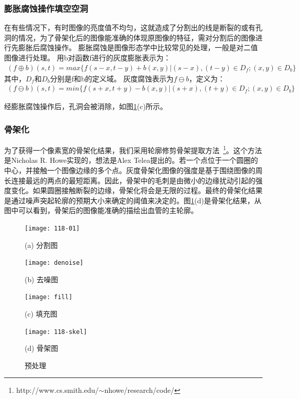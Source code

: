 \subsubsection{膨胀腐蚀操作填空空洞}
在有些情况下，有时图像的亮度值不均匀，这就造成了分割出的线是断裂的或有孔洞的情况，为了骨架化后的图像能准确的体现原图像的特征，需对分割后的图像进行先膨胀后腐蚀操作。
膨胀腐蚀是图像形态学中比较常见的处理，一般是对二值图像进行处理。
用b对函数f进行的灰度膨胀\cite{gang}表示为：
\begin{align}
(f\oplus b)(s,t)=max\{f(s-x, t-y)+b(x,y)|(s-x),(t-y)\in D_f;(x,y)\in D_b\}
\end{align}
其中，$D_f$和$D_b$分别是f和b的定义域。
灰度腐蚀表示为$f \ominus b$，定义为：
\begin{align}
(f \ominus b)(s,t)=min\{f(s+x, t+y)-b(x,y)|(s+x),(t+y)\in D_f;(x,y)\in D_b\}
\end{align}

经膨胀腐蚀操作后，孔洞会被消除，如图\ref{fig:Preprocessing}(c)所示。

\subsubsection{骨架化}
为了获得一个像素宽的骨架化结果，我们采用轮廓修剪骨架提取方法~\footnote{http://www.cs.smith.edu/$\sim$nhowe/research/code/}。这个方法是Nicholas R. Howe实现的，想法是Alex Telea提出的。若一个点位于一个圆圈的中心，并接触一个图像边缘的多个点。灰度骨架化图像的强度是基于围绕图像的周长连接最远的两点的最短距离。因此，骨架中的毛刺是由微小的边缘扰动引起的强度变化。如果圆圈接触断裂的边缘，骨架化将会是无限的过程。最终的骨架化结果是通过噪声突起轮廓的预期大小来确定的阈值来决定的。图\ref{fig:Preprocessing}(d)是骨架化结果，从图中可以看到，骨架后的图像能准确的描绘出血管的主轮廓。
\begin{figure}
\centering
  \begin{minipage}[b]{0.48\textwidth}
    \centering
    \texttt{[image: 118-01]}
      \centerline{(a) 分割图}\medskip
  \end{minipage}
  \begin{minipage}[b]{0.48\textwidth}
    \centering
    \texttt{[image: denoise]}
      \centerline{(b) 去噪图}\medskip
  \end{minipage}
  \begin{minipage}[b]{0.48\textwidth}
    \centering
    \texttt{[image: fill]}
      \centerline{(c) 填充图}\medskip
  \end{minipage}
  \begin{minipage}[b]{0.48\textwidth}
    \centering
    \texttt{[image: 118-skel]}
      \centerline{(d) 骨架图}\medskip
  \end{minipage}
\caption{预处理}
\label{fig:Preprocessing}
\end{figure}

